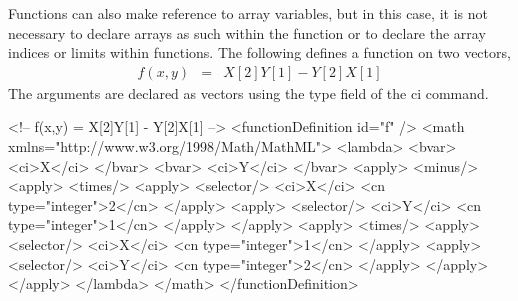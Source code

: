Functions can also make reference to array variables, but in this case, it is not necessary to declare arrays as such within the function or to declare the array indices or limits within functions.  The following defines a function on two vectors, 
\begin{eqnarray*}
f(x,y) & = & X[2]Y[1] - Y[2]X[1]
\end{eqnarray*}
The arguments are declared as vectors using the type field of the ci command.

\begin{example}
<!-- f(x,y) = X[2]Y[1] - Y[2]X[1] -->
<functionDefinition id="f" />
 <math xmlns="http://www.w3.org/1998/Math/MathML">
  <lambda>
   <bvar>
    <ci>X</ci>
   </bvar>
   <bvar>
    <ci>Y</ci>
   </bvar>
   <apply>
     <minus/>
       <apply>
         <times/>
           <apply>
             <selector/>
             <ci>X</ci>
             <cn type="integer">2</cn>
           </apply>
           <apply>
             <selector/>
             <ci>Y</ci>
             <cn type="integer">1</cn>
           </apply>
       </apply>
       <apply>
         <times/>
           <apply>
             <selector/>
             <ci>X</ci>
             <cn type="integer">1</cn>
           </apply>
           <apply>
             <selector/>
             <ci>Y</ci>
             <cn type="integer">2</cn>
           </apply>
       </apply>
   </apply>
  </lambda>
 </math>
</functionDefinition>
\end{example}
